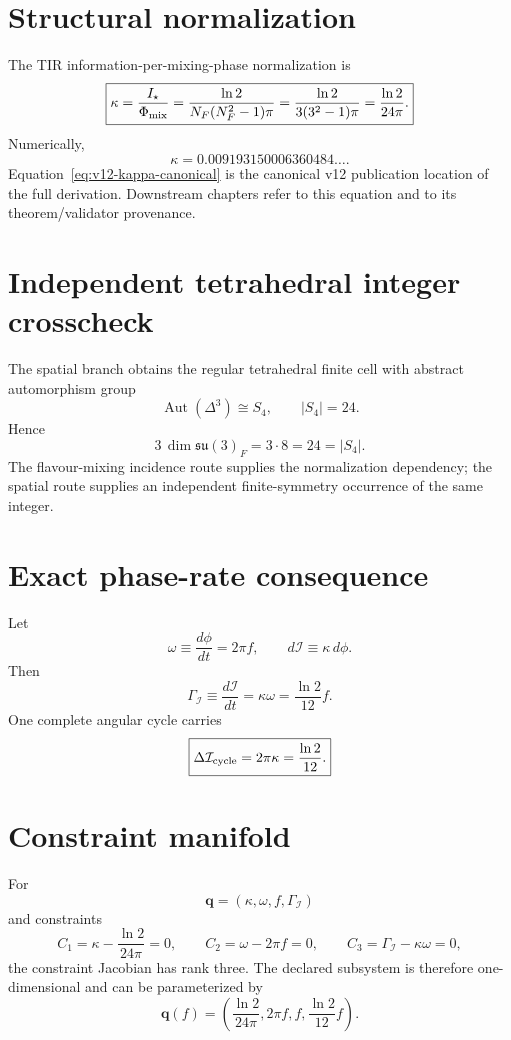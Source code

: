 \section{Structural normalization}
The TIR information-per-mixing-phase normalization is
\begin{equation}
\boxed{
\kappa
=\frac{I_\star}{\Phi_{\rm mix}}
=\frac{\ln2}{N_F(N_F^2-1)\pi}
=\frac{\ln2}{3(3^2-1)\pi}
=\frac{\ln2}{24\pi}.
}
\label{eq:v12-kappa-canonical}
\end{equation}
Numerically,
\[
\kappa
=0.009193150006360484\ldots .
\]
Equation~\eqref{eq:v12-kappa-canonical} is the canonical v12 publication
location of the full derivation.  Downstream chapters refer to this equation and
to its theorem/validator provenance.

\section{Independent tetrahedral integer crosscheck}
The spatial branch obtains the regular tetrahedral finite cell with abstract
automorphism group
\[
\operatorname{Aut}(\Delta^3)\cong S_4,
\qquad
|S_4|=24.
\]
Hence
\begin{equation}
\boxed{
3\,\dim\mathfrak{su}(3)_F
=3\cdot8
=24
=|S_4|.
}
\label{eq:v12-kappa-tetra-crosscheck}
\end{equation}
The flavour-mixing incidence route supplies the normalization dependency; the
spatial route supplies an independent finite-symmetry occurrence of the same
integer.

\section{Exact phase-rate consequence}
Let
\[
\omega\equiv\frac{d\phi}{dt}=2\pi f,
\qquad
d\mathcal I\equiv\kappa\,d\phi.
\]
Then
\begin{equation}
\boxed{
\Gamma_{\mathcal I}
\equiv\frac{d\mathcal I}{dt}
=\kappa\omega
=\frac{\ln2}{12}f.
}
\label{eq:v12-kappa-phase-rate}
\end{equation}
One complete angular cycle carries
\begin{equation}
\boxed{
\Delta\mathcal I_{\rm cycle}
=2\pi\kappa
=\frac{\ln2}{12}.
}
\label{eq:v12-kappa-information-cycle}
\end{equation}

\section{Constraint manifold}
For
\[
\mathbf q=(\kappa,\omega,f,\Gamma_{\mathcal I})
\]
and constraints
\[
C_1=\kappa-\frac{\ln2}{24\pi}=0,
\qquad
C_2=\omega-2\pi f=0,
\qquad
C_3=\Gamma_{\mathcal I}-\kappa\omega=0,
\]
the constraint Jacobian has rank three.  The declared subsystem is therefore
one-dimensional and can be parameterized by
\begin{equation}
\boxed{
\mathbf q(f)=
\left(
\frac{\ln2}{24\pi},
2\pi f,
f,
\frac{\ln2}{12}f
\right).
}
\label{eq:v12-kappa-constraint-curve}
\end{equation}

